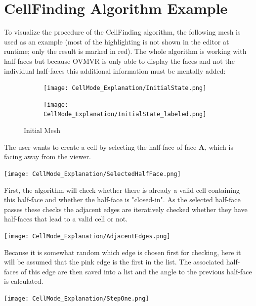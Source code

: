 \documentclass{report}
\begin{document}
\chapter{CellFinding Algorithm Example} \label{appendix:CFAExample}
	To visualize the procedure of the CellFinding algorithm, the following mesh is used as an example (most of the highlighting is not shown in the editor at runtime; only the result is marked in red). The whole algorithm is working with half-faces but because OVMVR is only able to display the faces and not the individual half-faces this additional information must be mentally added:
	\begin{figure}[H]
		\centering
		\begin{subfigure}[H]{3in}
			\centering
			\texttt{[image: CellMode\_Explanation/InitialState.png]}
			\label{pic:picB.1.a}
		\end{subfigure}
		\quad
		\begin{subfigure}[H]{3in}
			\centering
			\texttt{[image: CellMode\_Explanation/InitialState\_labeled.png]}
			\label{pic:picB.1.b}
		\end{subfigure}
		\caption{Initial Mesh}
		\label{pic:picB.1}
	\end{figure}
	\noindent The user wants to create a cell by selecting the half-face of face \textbf{A}, which is facing away from the viewer.
	\begin{center}
		\texttt{[image: CellMode\_Explanation/SelectedHalfFace.png]}
		\label{pic:picB.2}
	\end{center}
	First, the algorithm will check whether there is already a valid cell containing this half-face and whether the half-face is "closed-in". As the selected half-face passes these checks the adjacent edges are iteratively checked whether they have half-faces that lead to a valid cell or not.
	\begin{center}
		\texttt{[image: CellMode\_Explanation/AdjacentEdges.png]}
		\label{pic:picB.3}
	\end{center}
	Because it is somewhat random which edge is chosen first for checking, here it will be assumed that the pink edge is the first in the list. The associated half-faces of this edge are then saved into a list and the angle to the previous half-face is calculated.
	\begin{center}
		\texttt{[image: CellMode\_Explanation/StepOne.png]}
		\label{pic:picB.4}
	\end{center}
\end{document}
